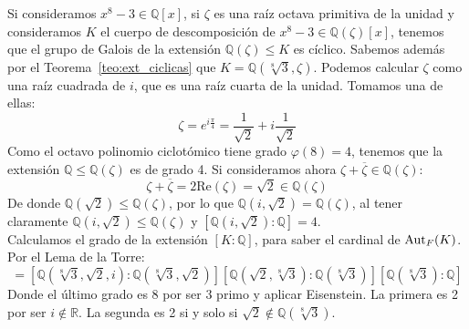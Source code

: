 \begin{ejemplo}  %
    Si consideramos $x^8-3\in \mathbb{Q}[x]$, si $\zeta$ es una raíz octava primitiva de la unidad y consideramos $K$ el cuerpo de descomposición de $x^8-3\in \mathbb{Q}(\zeta)[x]$, tenemos que el grupo de Galois de la extensión $\mathbb{Q}(\zeta)\leq K$ es cíclico. Sabemos además por el Teorema~\ref{teo:ext_ciclicas} que $K = \mathbb{Q}\left(\sqrt[8]{3}, \zeta\right)$. Podemos calcular $\zeta$ como una raíz cuadrada de $i$, que es una raíz cuarta de la unidad. Tomamos una de ellas:
    \begin{equation*}
        \zeta = e^{i\frac{\pi}{4}} = \frac{1}{\sqrt{2}} + i\frac{1}{\sqrt{2}}
    \end{equation*}
    Como el octavo polinomio ciclotómico tiene grado $\varphi(8) = 4$, tenemos que la extensión $\mathbb{Q}\leq\mathbb{Q}(\zeta)$ es de grado 4. Si consideramos ahora $\zeta+\overline{\zeta}\in \mathbb{Q}(\zeta)$:
    \begin{equation*}
        \zeta + \overline{\zeta} = 2\text{Re}(\zeta) = \sqrt{2} \in  \mathbb{Q}(\zeta)
    \end{equation*}
    De donde $\mathbb{Q}\left(\sqrt{2}\right)\leq \mathbb{Q}(\zeta)$, por lo que $\mathbb{Q}\left(i,\sqrt{2}\right) = \mathbb{Q}(\zeta)$, al tener claramente $\mathbb{Q}\left(i,\sqrt{2}\right)\leq \mathbb{Q}(\zeta)$ y $\left[\mathbb{Q}\left(i,\sqrt{2}\right):\mathbb{Q}\right] = 4$.\\

    \noindent
    Calculamos el grado de la extensión $[K:\mathbb{Q}]$, para saber el cardinal de $\operatorname{Aut}_F(K)$. Por el Lema de la Torre:
    \begin{equation*}
        [K:\mathbb{Q}] = \left[\mathbb{Q}\left(\sqrt[8]{3},\sqrt{2},i\right):\mathbb{Q}\left(\sqrt[8]{3},\sqrt{2}\right)\right] \left[\mathbb{Q}\left(\sqrt{2},\sqrt[8]{3}\right):\mathbb{Q}\left(\sqrt[8]{3}\right)\right] \left[\mathbb{Q}\left(\sqrt[8]{3}\right):\mathbb{Q}\right]
    \end{equation*}
    Donde el último grado es $8$ por ser 3 primo y aplicar Eisenstein. La primera es 2 por ser $i\notin \mathbb{R}$. La segunda es 2 si y solo si $\sqrt{2}\notin \mathbb{Q}\left(\sqrt[8]{3}\right)$. 


\end{ejemplo}
